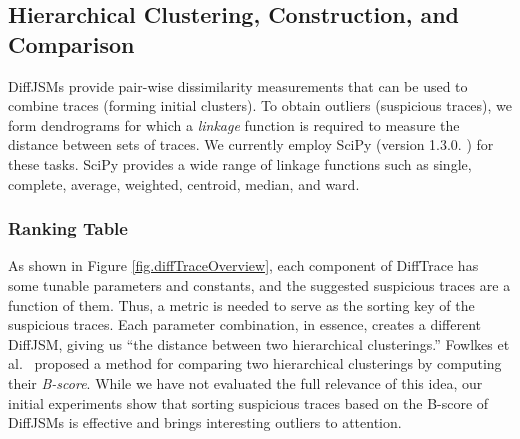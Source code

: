 \subsection{Hierarchical Clustering, Construction, and Comparison}
\label{subsec:algo-bscore}

 DiffJSMs provide pair-wise dissimilarity
 measurements that can be used to combine traces (forming initial clusters).
%
To obtain outliers (suspicious traces),
we form dendrograms for which
a \textit{linkage} function is required to measure the distance between sets of traces.
%
 We currently employ SciPy (version 1.3.0. \cite{scipy}) for these tasks.
%
%
 SciPy provides a wide range of linkage functions
 such as single, complete, average, weighted, centroid, median, and ward.

\subsubsection{Ranking Table}
As shown in Figure \ref{fig.diffTraceOverview},
each component of DiffTrace has some tunable parameters and constants,
and the suggested suspicious traces are a function of them.
%
Thus, a metric is needed to serve as the sorting key of the suspicious traces.
%
Each parameter combination, in essence, creates a different DiffJSM,
giving us ``the distance between two hierarchical clusterings.''
%
Fowlkes et al.~\cite{fowlkes83} proposed a method for comparing two
hierarchical clusterings by computing their \textit{B-score}.
%
While we have not evaluated the full relevance of this idea,
our initial experiments show that sorting suspicious traces based on the B-score of DiffJSMs is
effective and brings interesting outliers to attention.
